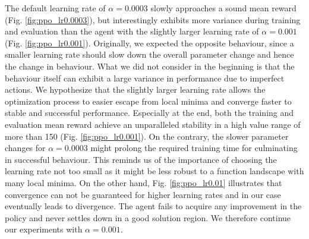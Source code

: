 \documentclass[a4paper, 11pt]{article}
\begin{document}
	The default learning rate of $\alpha=0.0003$ slowly approaches a sound mean reward (Fig. \ref{fig:ppo_lr0.0003}), but interestingly exhibits more variance during training and evaluation than the agent with the slightly larger learning rate of $\alpha=0.001$ (Fig. \ref{fig:ppo_lr0.001}). Originally, we expected the opposite behaviour, since a smaller learning rate should slow down the overall parameter change and hence the change in behaviour. What we did not consider in the beginning is that the behaviour itself can exhibit a large variance in performance due to imperfect actions.
	We hypothesize that the slightly larger learning rate allows the optimization process to easier escape from local minima and converge faster to stable and successful performance. Especially at the end, both the training and evaluation mean reward achieve an unparalleled stability in a high value range of more than 150 (Fig. \ref{fig:ppo_lr0.001}).
	On the contrary, the slower parameter changes for $\alpha=0.0003$ might prolong the required training time for culminating in successful behaviour. This reminds us of the importance of choosing the learning rate not too small as it might be less robust to a function landscape with many local minima. On the other hand, Fig. \ref{fig:ppo_lr0.01} illustrates that convergence can not be guaranteed for higher learning rates and in our case eventually leads to divergence. The agent fails to acquire any improvement in the policy and never settles down in a good solution region.
	We therefore continue our experiments with $\alpha=0.001$.
	
\end{document}
